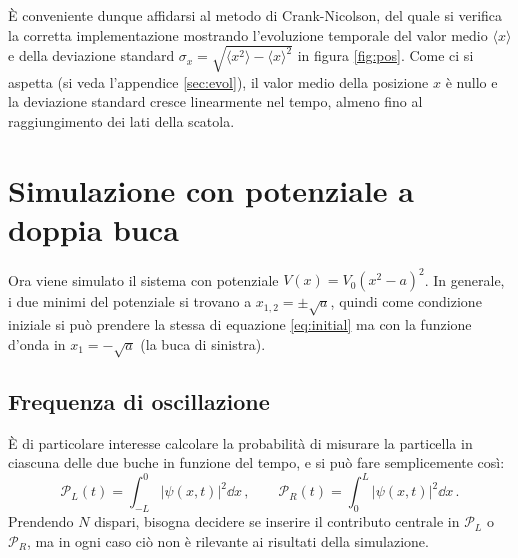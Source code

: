 \documentclass[a4paper, titlepage]{article}
\numberwithin{equation}{section}
\begin{document}
È conveniente dunque affidarsi al metodo di Crank-Nicolson, del quale si verifica la corretta implementazione mostrando l'evoluzione temporale del valor medio $\langle x \rangle$ e della deviazione standard $\sigma_x = \sqrt{\langle x^2 \rangle - \langle x \rangle^2}$ in figura \ref{fig:pos}. Come ci si aspetta (si veda l'appendice \ref{sec:evol}), il valor medio della posizione $x$ è nullo e la deviazione standard cresce linearmente nel tempo, almeno fino al raggiungimento dei lati della scatola.


\section{Simulazione con potenziale a doppia buca}

Ora viene simulato il sistema con potenziale $V(x) = V_0(x^2-a)^2$. In generale, i due minimi del potenziale si trovano a $x_{1,2} = \pm \sqrt{a}$, quindi come condizione iniziale si può prendere la stessa di equazione \eqref{eq:initial} ma con la funzione d'onda in $x_1 = -\sqrt{a}$ (la buca di sinistra). 

\subsection{Frequenza di oscillazione}

È di particolare interesse calcolare la probabilità di misurare la particella in ciascuna delle due buche in funzione del tempo, e si può fare semplicemente così:
\[
    \mathcal{P}_L(t) = \int_{-L}^0 |\psi(x,t)|^2 \dd x\, ,
    \qquad
    \mathcal{P}_R(t) = \int_0^L |\psi(x,t)|^2 \dd x\, .
\]
Prendendo $N$ dispari, bisogna decidere se inserire il contributo centrale in $\mathcal{P}_L$ o  $\mathcal{P}_R$, ma in ogni caso ciò non è rilevante ai risultati della simulazione. 
\end{document}
